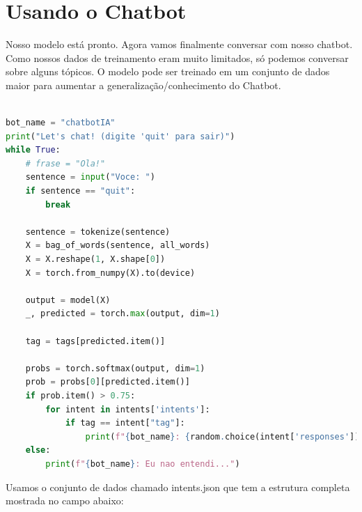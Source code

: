 \section[Usando o Chatbot]{Usando o Chatbot}

Nosso modelo está pronto. Agora vamos finalmente conversar com nosso chatbot. Como nossos dados de treinamento eram muito limitados, só podemos conversar sobre alguns tópicos. O modelo pode ser treinado em um conjunto de dados maior para aumentar a generalização/conhecimento do Chatbot.

\begin{lstlisting}[language=Python, caption=Chatbot]

bot_name = "chatbotIA"
print("Let's chat! (digite 'quit' para sair)")
while True:
    # frase = "Ola!"
    sentence = input("Voce: ")
    if sentence == "quit":
        break

    sentence = tokenize(sentence)
    X = bag_of_words(sentence, all_words)
    X = X.reshape(1, X.shape[0])
    X = torch.from_numpy(X).to(device)

    output = model(X)
    _, predicted = torch.max(output, dim=1)

    tag = tags[predicted.item()]

    probs = torch.softmax(output, dim=1)
    prob = probs[0][predicted.item()]
    if prob.item() > 0.75:
        for intent in intents['intents']:
            if tag == intent["tag"]:
                print(f"{bot_name}: {random.choice(intent['responses'])}")
    else:
        print(f"{bot_name}: Eu nao entendi...")


\end{lstlisting}
Usamos o conjunto de dados chamado intents.json que tem a estrutura completa mostrada
no campo abaixo:
